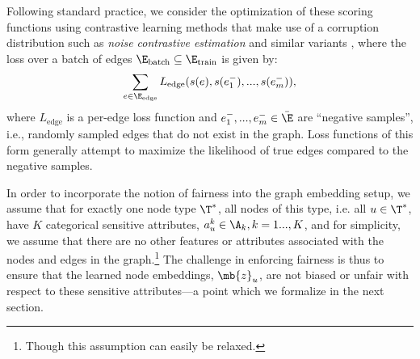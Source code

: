 Following standard practice, we consider the optimization of these scoring functions using contrastive learning methods that make use of a corruption distribution such as {\em noise contrastive estimation} \cite{dyer2014notes,mnih2012fast} and similar variants \cite{bose2018adversarial}, where the loss over a batch of edges 
$\E_{\textrm{batch}} \subseteq \E_{\textrm{train}}$ is given by:
\begin{equation}\label{eq:genericloss}
    \sum_{e \in \E_{\textrm{edge}}} L_{\textrm{edge}}(s(e), s(e^{-}_1), ..., s(e^{-}_m)),
\end{equation}
where $L_{\textrm{edge}}$ is a per-edge loss function and $e^{-}_1, ..., e^{-}_m \in \bar{\E}$ are ``negative samples'', i.e., randomly sampled edges that do not exist in the graph.
Loss functions of this form generally attempt to maximize the likelihood of true edges compared to the negative samples. 


In order to incorporate the notion of fairness into the graph embedding setup, we assume that for exactly one node type $\T^*$, all nodes of this type, i.e. all $u \in \T^*$, have $K$ categorical sensitive attributes, $a^k_u \in \A_k, k=1...,K$, and for simplicity, we assume that there are no other features or attributes associated with the nodes and edges in the graph.\footnote{Though this assumption can easily be relaxed.}
The challenge in enforcing fairness is thus to ensure that the learned node embeddings, $\mb{z}_u$, are not biased or unfair with respect to these sensitive attributes---a point which we formalize in the next section. 
